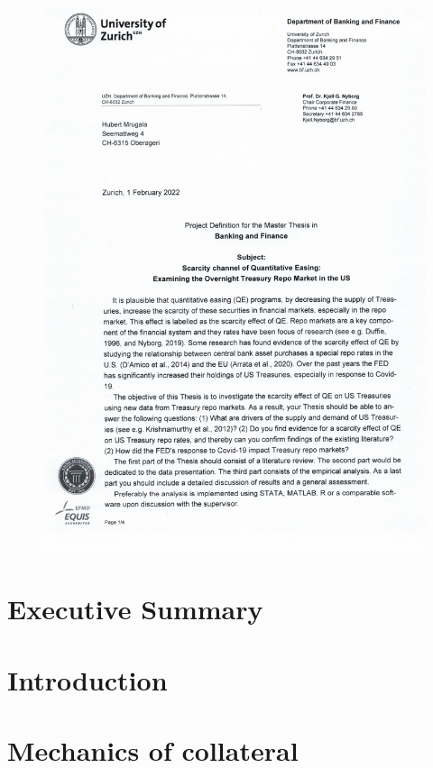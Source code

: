 \documentclass[11pt,a4paper,english,oneside]{book}
\numberwithin{equation}{chapter}
\begin{document}
\begin{figure}[h!]
  \begin{center}
    \includegraphics[page=4,width=.86\textwidth]{../../project_definition.pdf}
  \end{center}
\end{figure}

\thispagestyle{firststyle}
\newpage
\section*{Executive Summary}
\thispagestyle{firststyle}

\lipsum[1-3] %


\tableofcontents
\listoffigures
\listoftables
\newpage
{}

\section{Introduction}

\lipsum

\section{Mechanics of collateral}
\end{document}
